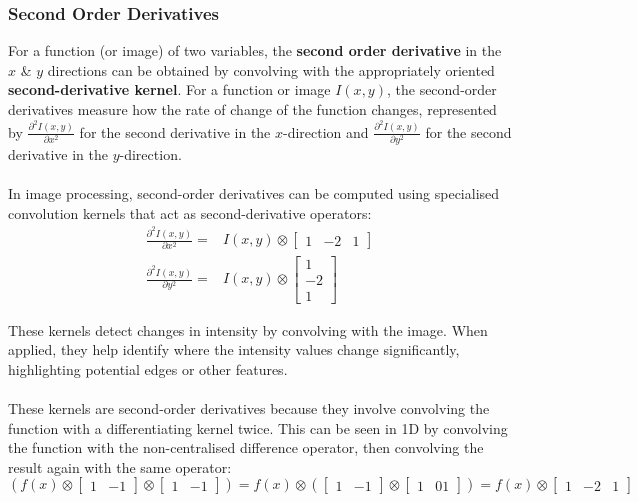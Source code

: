 \documentclass[a4paper,11pt]{article}
\begin{document}
\subsubsection{Second Order Derivatives}
For a function (or image) of two variables, the \textbf{second order derivative} in the $x$ \& $y$ directions can be obtained by convolving with the appropriately oriented \textbf{second-derivative kernel}.
For a function or image $I(x,y)$, the second-order derivatives measure how the rate of change of the function changes, represented by $\frac{\partial^2 I(x,y)}{\partial x^2}$ for the second derivative in the $x$-direction and $\frac{\partial^2 I(x,y)}{\partial y^2}$ for the second derivative in the $y$-direction.
\\\\
In image processing, second-order derivatives can be computed using specialised convolution kernels that act as second-derivative operators:
\begin{align*}
    \frac{\partial^2 I(x,y)}{\partial x^2} =& I(x,y) \otimes
    \begin{bmatrix}
        1 & -2 & 1
    \end{bmatrix}\\
    \frac{\partial^2 I(x,y)}{\partial y^2} =& I(x,y) \otimes
    \begin{bmatrix}
        1 \\
        -2 \\
        1
    \end{bmatrix}
\end{align*}

These kernels detect changes in intensity by convolving with the image.
When applied, they help identify where the intensity values change significantly, highlighting potential edges or other features.
\\\\
These kernels are second-order derivatives because they involve convolving the function with a differentiating kernel twice.
This can be seen in 1D by convolving the function with the non-centralised difference operator, then convolving the result again with the same operator:
\[
    (f(x) \otimes \begin{bmatrix}1 & -1\end{bmatrix} \otimes \begin{bmatrix} 1 & -1 \end{bmatrix}) = f(x) \otimes (\begin{bmatrix} 1 & -1 \end{bmatrix} \otimes \begin{bmatrix} 1 & 01 \end{bmatrix}) = f(x) \otimes \begin{bmatrix} 1 & -2 & 1 \end{bmatrix}
\]
\end{document}
